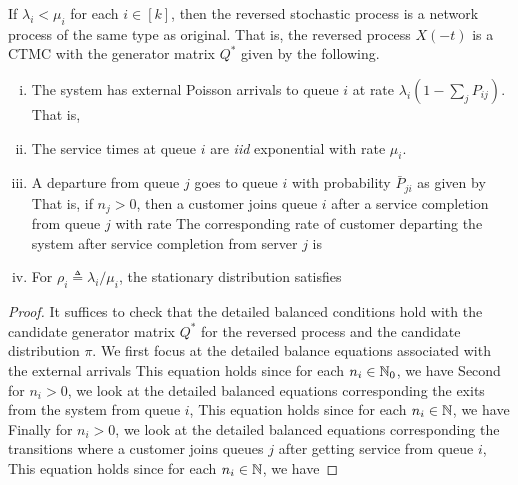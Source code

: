 \documentclass[a4paper,10pt,english]{article}
\begin{document}
\begin{thm}
If $\lambda_i < \mu_i$ for each $i \in [k]$, then the reversed stochastic process is a network process of the same type as original. 
That is, the reversed process $X(-t)$ is a CTMC with the generator matrix $Q^{\ast}$ given by the following.  
\begin{enumerate}[(i)]
\item The system has external Poisson arrivals to queue $i$ at rate $\lambda_i(1-\sum_jP_{ij})$. 
That is, 
\item The service times at queue $i$ are \textit{iid} exponential with rate $\mu_i$. 
\item  A departure from queue $j$ goes to queue $i$ with probability $\bar{P}_{ji}$ as given by
That is, if $n_j > 0$, then a customer joins queue $i$ after a service completion from queue $j$ with rate 
The corresponding rate of customer departing the system after service completion from server $j$ is
\item For $\rho_i \triangleq \lambda_i/\mu_i$, the stationary distribution satisfies
\end{enumerate}
\end{thm}
\begin{proof} 
It suffices to check that the detailed balanced conditions hold with the candidate generator matrix $Q^{\ast}$ for the reversed process and the candidate distribution $\pi$. 
We first focus at the detailed balance equations associated with the external arrivals 
This equation holds since for each $n_i \in \mathbb{N}_0$, we have 
Second for $n_i > 0$, we look at the detailed balanced equations corresponding the exits from the system from queue $i$,
This equation holds since for each $n_i \in \mathbb{N}$, we have 
Finally for $n_i > 0$, we look at the detailed balanced equations corresponding the transitions where a customer joins queues $j$ after getting service from queue $i$,
This equation holds since for each $n_i \in \mathbb{N}$, we have 
\end{proof}
\end{document}
